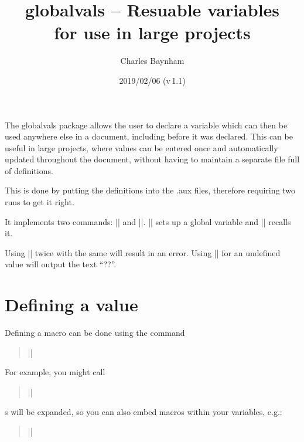 \documentclass[a4paper]{ltxdoc}
\begin{document}
\title{\textsf{globalvals} -- Resuable variables \\ 
for use in large projects}
\author{Charles Baynham}
\date{2019/02/06 (v\,1.1)}
\maketitle

\noindent
The \textsf{globalvals} package allows the user to declare a variable which can then be used anywhere else in a document, including before it was declared. This can be useful in large projects, where values can be entered once and automatically updated throughout the document, without having to maintain a separate file full of definitions. 

This is done by putting the definitions into the .aux files, therefore requiring two runs to get it right.

It implements two commands: || and ||. ||
sets up a global variable and |\useVal| recalls it.

Using || twice with the same  will result in an error. Using |\useVal| for an undefined
value will output the text ``\textsc{??}''.

\section{Defining a value}
\label{sec:defining}

%
Defining a macro can be done using the command 
\begin{quote}
	||
\end{quote}

For example, you might call 
\begin{quote}
	||
\end{quote}

s will be expanded, so you can also embed macros within your variables, e.g.:
\begin{quote}
	||
\end{quote}
\end{document}
